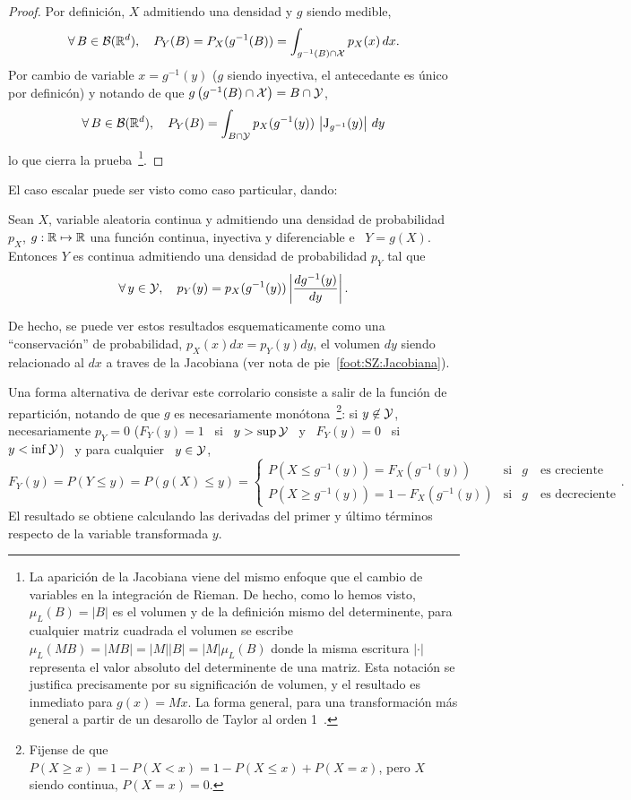 \begin{proof}
Por definici\'on, $X$ admitiendo una densidad y $g$ siendo medible,
%
\[
\forall \, B  \in \mathcal{B}(\mathbb{R}^d), \quad P_Y(B) =  P_X(g^{-1}(B)) = \int_{g^{-1}(B) \cap \mathcal{X}}
p_X(x) \, dx.
\]
%
Por cambio de variable $x =  g^{-1}(y)$ ($g$ siendo inyectiva, el antecedante es
\'unico por definic\'on) y notando de que $g\left( g^{-1}(B) \cap \mathcal{X} \right) = B
\cap \mathcal{Y}$,
%
\[
\forall \, B \in \mathcal{B}(\mathbb{R}^d), \quad  P_Y(B) = \int_{B \cap \mathcal{Y}} p_X(g^{-1}(y)) \,
\left| \operatorname{J}_{g^{-1}}(y) \right| \, dy
\]
%
lo que cierra la prueba~\footnote{La aparici\'on de la Jacobiana viene del mismo
  enfoque que  el cambio de variables  en la integraci\'on de  Rieman. De hecho,
  como lo hemos visto, $\mu_L(B) = |B|$ es el volumen y de la definici\'on mismo
  del  determinente, para  cualquier matriz  cuadrada  el volumen  se escribe  \
  $\mu_L(M  B) =  |M B|  = |M|  |B|  = |M|  \mu_L(B)$ donde  la misma  escritura
  $|\cdot|$ representa  el valor absoluto  del determinente de una  matriz. Esta
  notaci\'on se justifica  precisamente por su significaci\'on de  volumen, y el
  resultado  es  inmediato  para $g(x)  =  M  x$.  La  forma general,  para  una
  transformaci\'on m\'as  general a  partir de un  desarollo de Taylor  al orden
  1~\cite{AthLah06, Coh13}.}.
\end{proof}

El caso escalar puede ser visto como caso particular, dando:
%
\begin{corolario}
  Sean  $X$,   variable  aleatoria  continua   y  admitiendo  una   densidad  de
  probabilidad $p_X$, $g:\mathbb{R} \mapsto  \mathbb{R}$ una funci\'on continua, inyectiva
  y  diferenciable e  \ $Y  = g(X)$.   Entonces $Y$  es continua  admitiendo una
  densidad de probabilidad $p_Y$ tal que
  \[
  \forall  \,   y  \in  \mathcal{Y},   \quad  p_Y(y)  =  p_X(g^{-1}(y))   \left|  \frac{d
      g^{-1}(y)}{dy} \right|.
  \]
\end{corolario}
%
\noindent  De hecho,  se puede  ver estos  resultados esquematicamente  como una
``conservaci\'on'' de  probabilidad, $p_X(x)  dx = p_Y(y)  dy$, el  volumen $dy$
siendo   relacionado  al  $dx$   a  traves   de  la   Jacobiana  (ver   nota  de
pie~\ref{foot:SZ:Jacobiana}).

Una  forma  alternativa  de derivar  este  corrolario  consiste  a salir  de  la
funci\'on   de   repartici\'on,   notando   de   que   $g$   es   necesariamente
mon\'otona~\footnote{Fijense de que $P(X \ge x) = 1 -  P(X < x) = 1 - P(X \le x) +
  P(X =  x)$, pero $X$ siendo  continua, $ P(X =  x) = 0$.}: si  $y \not\in \mathcal{Y}$,
necesariamente $p_Y = 0$ ($F_Y(y) = 1$ \ si \ $y > \sup \mathcal{Y}$ \ y \ $F_Y(y) = 0$ \
si \ $y < \inf \mathcal{Y}$) \ y para cualquier \ $y \in \mathcal{Y}$,
%
\[
F_Y(y) = P(Y \le y) = P(g(X) \le y) =
\left\{\begin{array}{lll}
P(X \le g^{-1}(y)) = F_X(g^{-1}(y)) & \mbox{si} & g \quad \mbox{es creciente}\\[2.5mm]
%
P(X \ge g^{-1}(y)) = 1 - F_X(g^{-1}(y)) & \mbox{si} & g \quad \mbox{es decreciente}
\end{array}\right..
\]
%
El  resultado  se  obtiene  calculando  las  derivadas  del  primer  y  \'ultimo
t\'erminos respecto de la variable transformada $y$.

